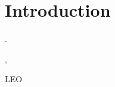 %
%
%
%
%

%
%
%
%
%
%

\chapter{Introduction} \label{ch:introduction}

.

\cite{test}, \cite{obdh2}

LEO
